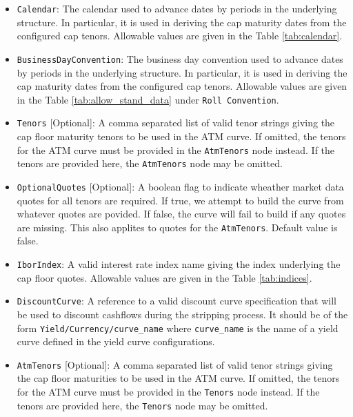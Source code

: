 \begin{itemize}
\item \lstinline!Calendar!:
The calendar used to advance dates by periods in the underlying structure. In particular, it is used in deriving the cap maturity dates from the configured cap tenors. Allowable values are given in the Table \ref{tab:calendar}.

\item \lstinline!BusinessDayConvention!:
The business day convention used to advance dates by periods in the underlying structure. In particular, it is used in deriving the cap maturity dates from the configured cap tenors. Allowable values are given in the Table \ref{tab:allow_stand_data} under \lstinline!Roll Convention!.

\item \lstinline!Tenors! [Optional]:
A comma separated list of valid tenor strings giving the cap floor maturity tenors to be used in the ATM curve. If omitted, the tenors for the ATM curve must be provided in the \lstinline!AtmTenors! node instead. If the tenors are provided here, the \lstinline!AtmTenors! node may be omitted.

\item \lstinline!OptionalQuotes! [Optional]:
A boolean flag to indicate wheather market data quotes for all tenors are required. If true, we attempt to build the curve from whatever quotes are povided. If false, the curve will fail to build if any quotes are missing. This also applites to quotes for the \lstinline!AtmTenors!. Default value is false.

\item \lstinline!IborIndex!:
A valid interest rate index name giving the index underlying the cap floor quotes. Allowable values are given in the Table \ref{tab:indices}.

\item \lstinline!DiscountCurve!:
A reference to a valid discount curve specification that will be used to discount cashflows during the stripping process. It should be of the form \lstinline!Yield/Currency/curve_name! where \lstinline!curve_name! is the name of a yield curve defined in the yield curve configurations.

\item \lstinline!AtmTenors! [Optional]:
A comma separated list of valid tenor strings giving the cap floor maturities to be used in the ATM curve. If omitted, the tenors for the ATM curve must be provided in the \lstinline!Tenors! node instead. If the tenors are provided here, the \lstinline!Tenors! node may be omitted.


\end{itemize}
